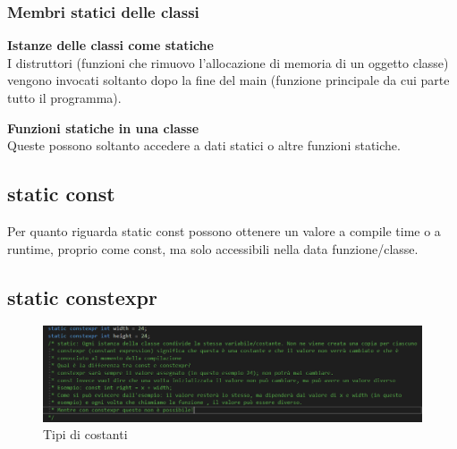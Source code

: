 \subsubsection{Membri statici delle classi} %

\centering\textbf{Istanze delle classi come statiche} \\

\textsf{\small I distruttori (funzioni che rimuovo l'allocazione di memoria di un oggetto classe) vengono invocati soltanto dopo la fine del main (funzione principale da cui parte tutto il programma).} \break

\centering\textbf{Funzioni statiche in una classe} \\

\textsf{\small Queste possono soltanto accedere a dati statici o altre funzioni statiche.} \\

\subsection{static const}

\textsf{\small Per quanto riguarda \color{myblue2} static const \normalcolor possono ottenere un valore a compile time o a runtime, proprio come \color{myblue2} const, \normalcolor ma solo accessibili nella data funzione/classe.}\\

\subsection{static constexpr}


\begin{figure}[ht]
	\centering
	\includegraphics[width=1.2\textwidth, height=1.2\textheight, keepaspectratio]{./imgs/constexpr_e_const_differenze.png}
	\caption{Tipi di costanti}
	\label{fig:constants}
\end{figure}


